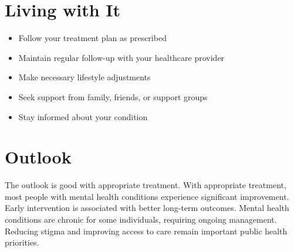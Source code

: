 \section{Living with It}
\begin{itemize}[noitemsep]
  \item Follow your treatment plan as prescribed
  \item Maintain regular follow-up with your healthcare provider
  \item Make necessary lifestyle adjustments
  \item Seek support from family, friends, or support groups
  \item Stay informed about your condition
\end{itemize}
\section{Outlook}
The outlook is good with appropriate treatment. With appropriate treatment, most people with mental health conditions experience significant improvement. Early intervention is associated with better long-term outcomes. Mental health conditions are chronic for some individuals, requiring ongoing management. Reducing stigma and improving access to care remain important public health priorities.
